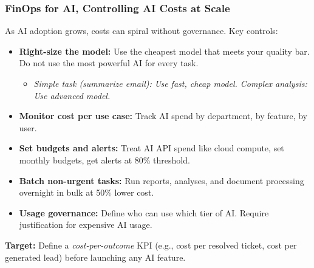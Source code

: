 \begin{frame}[fragile]\frametitle{FinOps for AI, Controlling AI Costs at Scale}

As AI adoption grows, costs can spiral without governance. Key controls:
\begin{itemize}
  \item \textbf{Right-size the model:} Use the cheapest model that meets your quality bar. Do not use the most powerful AI for every task.
    \begin{itemize}
      \item \textit{Simple task (summarize email): Use fast, cheap model. Complex analysis: Use advanced model.}
    \end{itemize}
  \item \textbf{Monitor cost per use case:} Track AI spend by department, by feature, by user.
  \item \textbf{Set budgets and alerts:} Treat AI API spend like cloud compute, set monthly budgets, get alerts at 80\% threshold.
  \item \textbf{Batch non-urgent tasks:} Run reports, analyses, and document processing overnight in bulk at 50\% lower cost.
  \item \textbf{Usage governance:} Define who can use which tier of AI. Require justification for expensive AI usage.
\end{itemize}

\textbf{Target:} Define a \textit{cost-per-outcome} KPI (e.g., cost per resolved ticket, cost per generated lead) before launching any AI feature.

\end{frame}

